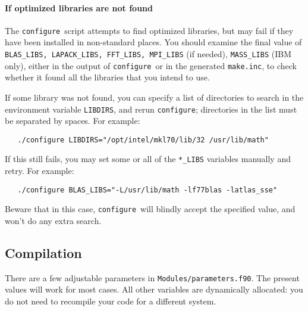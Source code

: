 \documentclass[12pt,a4paper]{article}
\def\configure{\texttt{configure}}
\begin{document}
\paragraph{If optimized libraries are not found}
The \configure\ script attempts to find optimized libraries, but may fail
if they have been installed in non-standard places. You should examine
the final value of \texttt{BLAS\_LIBS, LAPACK\_LIBS, FFT\_LIBS, MPI\_LIBS} (if needed),
\texttt{MASS\_LIBS} (IBM only), either in the output of \configure\ or in the generated
\texttt{make.inc}, to check whether it found all the libraries that you intend to use.

If some library was not found, you can specify a list of directories to search
in the environment variable \texttt{LIBDIRS},
and rerun \configure; directories in the
list must be separated by spaces. For example:
\begin{verbatim}
   ./configure LIBDIRS="/opt/intel/mkl70/lib/32 /usr/lib/math"
\end{verbatim}
If this still fails, you may set some or all of the \texttt{*\_LIBS} variables manually
and retry. For example:
\begin{verbatim}
   ./configure BLAS_LIBS="-L/usr/lib/math -lf77blas -latlas_sse"
\end{verbatim}
Beware that in this case, \configure\ will blindly accept the specified value,
and won't do any extra search.

\subsection{Compilation}
\label{SubSec:Compilation}

There are a few adjustable parameters in \texttt{Modules/parameters.f90}.
The
present values will work for most cases. All other variables are dynamically
allocated: you do not need to recompile your code for a different system.
\end{document}
